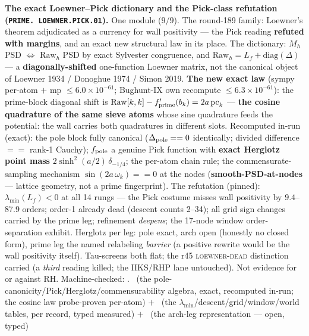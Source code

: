 \par\smallskip\noindent\textbf{The exact Loewner--Pick dictionary
and the Pick-class refutation (\texttt{PRIME.\allowbreak
LOEWNER.\allowbreak PICK.01}).}
One module ($9/9$).  The round-189 family: Loewner's theorem
adjudicated as a currency for wall positivity --- the Pick
reading \textbf{refuted with margins}, and an exact new
structural law in its place.  The dictionary: $M_h$ PSD
$\Leftrightarrow$ $\mathrm{Raw}_h$ PSD by exact Sylvester
congruence, and $\mathrm{Raw}_h = L_f + \mathrm{diag}(\Delta)$
--- a \textbf{diagonally-shifted} one-function Loewner matrix,
not the canonical object of Loewner 1934 / Donoghue 1974 / Simon
2019.  \textbf{The new exact law} (sympy per-atom $+$ mp $\le
6.0\times10^{-61}$; Bughunt-IX own recompute $\le
6.3\times10^{-61}$): the prime-block diagonal shift is
$\mathrm{Raw}[k,k] - f_{\rm prime}'(b_k) = 2a\,\mathrm{pc}_k$ ---
\textbf{the cosine quadrature of the same sieve atoms} whose sine
quadrature feeds the potential: the wall carries both quadratures
in different slots.  Recomputed in-run (exact): the pole block
fully canonical ($\Delta_{\rm pole} == 0$ identically; divided
difference $==$ rank-1 Cauchy); $f_{\rm pole}$ a genuine Pick
function with \textbf{exact Herglotz point mass}
$2\sinh^2(a/2)\,\delta_{-1/4}$; the per-atom chain rule; the
commensurate-sampling mechanism $\sin(2a\,\omega_k) == 0$ at the
nodes (\textbf{smooth-PSD-at-nodes} --- lattice geometry, not a
prime fingerprint).  The refutation (pinned):
$\lambda_{\min}(L_f) < 0$ at all 14 rungs --- the Pick costume
misses wall positivity by $9.4$--$87.9$ orders; order-1 already
dead (descent counts 2--34); all grid sign changes carried by the
prime leg; refinement \emph{deepens}; the 17-node window
order-separation exhibit.  Herglotz per leg: pole exact, arch
open (honestly no closed form), prime leg the named relabeling
\emph{barrier} (a positive rewrite would be the wall positivity
itself).  Tau-screens both flat; the r45 \textsc{loewner-dead}
distinction carried (a \emph{third} reading killed; the IIKS/RHP
lane untouched).  Not evidence for or against RH.
Machine-checked: .
\mE\ (the pole-canonicity/Pick/Herglotz/commensurability algebra,
exact, recomputed in-run; the cosine law probe-proven per-atom)
$+$ \mC\ (the $\lambda_{\min}$/descent/grid/window/world tables,
per record, typed measured) $+$ \mO\ (the arch-leg representation
--- open, typed)
\par\smallskip


